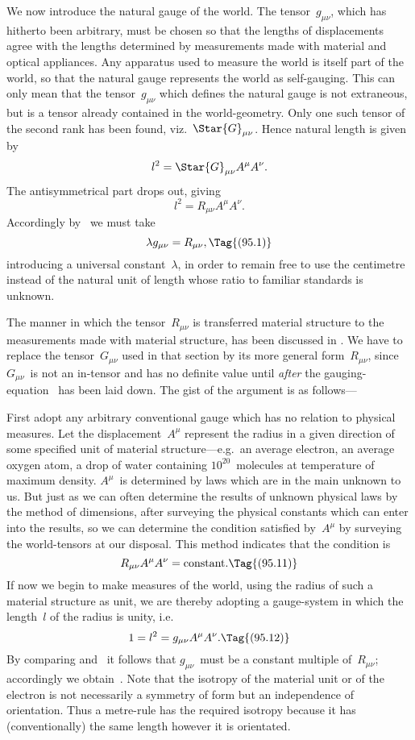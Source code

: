 \documentclass[12pt]{book}
\begin{document}
We now introduce the natural gauge of the world. The tensor~$g_{\mu\nu}$, which
has hitherto been arbitrary, must be chosen so that the lengths of displacements
agree with the lengths determined by measurements made with material
and optical appliances. Any apparatus used to measure the world is itself part
of the world, so that the natural gauge represents the world as self-gauging.
%
This can only mean that the tensor~$g_{\mu\nu}$ which defines the natural gauge is
not extraneous, but is a tensor already contained in the world-geometry. Only
one such tensor of the second rank has been found, viz.~$\Star{G}_{\mu\nu}$. Hence natural
length is given by
\[
l^{2} = \Star{G}_{\mu\nu} A^{\mu} A^{\nu}.
\]
The antisymmetrical part drops out, giving
\[
l^{2} = R_{\mu\nu} A^{\mu} A^{\nu}.
\]
Accordingly by~ we must take
\[
\lambda g_{\mu\nu} = R_{\mu\nu},
\Tag{(95.1)}
\]
introducing a universal constant~$\lambda$, in order to remain free to use the centimetre
instead of the natural unit of length whose ratio to familiar standards
is unknown.

The manner in which the tensor~$R_{\mu\nu}$ is transferred  material structure
to the measurements made with material structure, has been discussed in
. We have to replace the tensor~$G_{\mu\nu}$ used in that section by its more
general form~$R_{\mu\nu}$, since $G_{\mu\nu}$~is not an in-tensor and has no definite value
until \emph{after} the gauging-equation~ has been laid down. The gist of the
argument is as follows---

First adopt any arbitrary conventional gauge which has no relation to
%
%
physical measures. Let the displacement~$A^{\mu}$ represent the radius in a given
direction of some specified unit of material structure---e.g.\ an average electron,
an average oxygen atom, a drop of water containing $10^{20}$~molecules at temperature
of maximum density. $A^{\mu}$~is determined by laws which are in the main
unknown to us. But just as we can often determine the results of unknown
physical laws by the method of dimensions, after surveying the physical
constants which can enter into the results, so we can determine the condition
satisfied by~$A^{\mu}$ by surveying the world-tensors at our disposal. This method
indicates that the condition is
\[
R_{\mu\nu} A^{\mu} A^{\nu} = \text{constant}.
\Tag{(95.11)}
\]
If now we begin to make measures of the world, using the radius of such a
material structure as unit, we are thereby adopting a gauge-system in which
the length~$l$ of the radius is unity, i.e.\
\[
1 = l^{2} = g_{\mu\nu} A^{\mu} A^{\nu}.
\Tag{(95.12)}
\]
By comparing  and~ it follows that $g_{\mu\nu}$~must be a constant
multiple of~$R_{\mu\nu}$; accordingly we obtain~\Eq{(95.1)}\footnotemark.\footnotetext
  {Note that the isotropy of the material unit or of the electron is not necessarily a symmetry
  of form but an independence of orientation. Thus a metre-rule has the required isotropy because
  it has (conventionally) the same length however it is orientated.}
\end{document}
